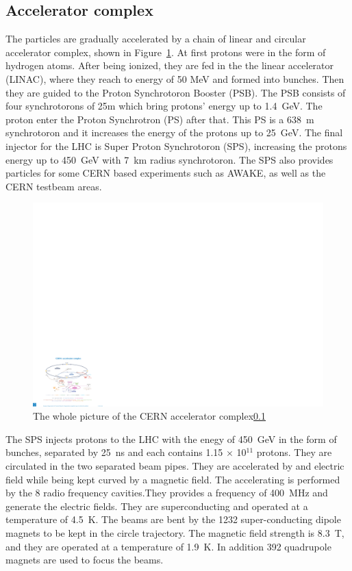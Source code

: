 \subsection{Accelerator complex}
The particles are gradually accelerated by a chain of linear and circular accelerator complex, shown in Figure~\ref{fig:accelerator}. At first protons were in the form of hydrogen atoms. After being ionized, they are fed in the the linear accelerator (LINAC), where they reach to energy of 50 MeV and formed into bunches. Then they are guided to the Proton Synchrotoron Booster (PSB). The PSB consists of four synchrotorons of 25m which bring protons' energy up to 1.4~GeV. The proton enter the Proton Synchrotron (PS) after that. This PS is a 638~m synchrotoron and it increases the energy of the protons up to 25~GeV. The final injector for the LHC is Super Proton Synchrotoron (SPS), increasing the protons energy up to 450~GeV with 7~km radius synchrotoron. The SPS also provides particles for some CERN based experiments such as AWAKE, as well as the CERN testbeam areas. \\
\begin{figure}[tbp]
\begin{center}
 \includegraphics[width=1.0\textwidth,keepaspectratio]{figures/detector/CERN}
\caption{
The whole picture of the CERN accelerator complex\ref{}
}
\label{fig:accelerator}
\end{center}
\end{figure}
The SPS injects protons to the LHC with the enegy of 450~GeV in the form of bunches, separated by 25~ns and each contains 1.15 $\times$ 10$^{11}$ protons. They are circulated in the two separated beam pipes. They are accelerated by and electric field while being kept curved by a magnetic field. The accelerating is performed by the 8 radio frequency cavities.They provides a frequency of 400~MHz and generate the electric fields. They are superconducting and operated at a temperature of 4.5~K. The beams are bent by the 1232 super-conducting dipole magnets to be kept in the circle trajectory. The magnetic field strength is 8.3~T, and they are operated at a temperature of 1.9~K. In addition 392 quadrupole magnets are used to focus the beams. \\

